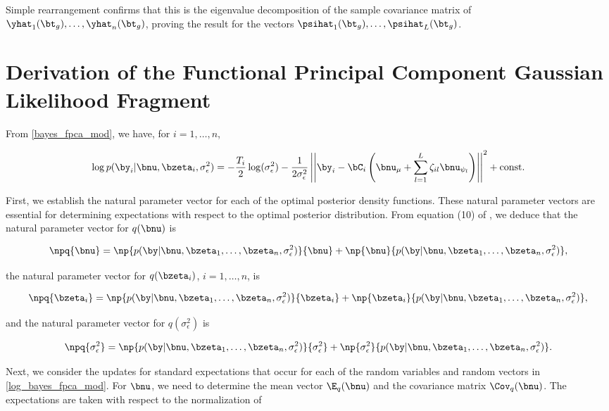 \documentclass[12pt]{article}
\theoremstyle{plain}
\theoremstyle{definition}
\theoremstyle{remark}
\def\sigsqeps{\sigma^2_{\epsilon}}
\def\const{\text{const.}}
\def\numu{\bnu_\mu}
\newcommand\nupsi[1]{\bnu_{\psi_{#1}}}
\begin{document}
\noindent Simple rearrangement confirms that this is the eigenvalue decomposition of
the sample covariance matrix of $\yhat_1 (\bt_g), \dots, \yhat_n (\bt_g)$, proving the result for the vectors
$\psihat_1 (\bt_g), \dots, \psihat_L (\bt_g)$.


\section{Derivation of the Functional Principal Component Gaussian Likelihood Fragment}
\label{app:fpca_gauss_lik_frag}

From \eqref{bayes_fpca_mod}, we have, for $i = 1, \dots, n$, 

\begin{equation}
	\log p (\by_i | \bnu, \bzeta_i, \sigsqeps) =
		-\frac{T_i}{2} \log (\sigsqeps)
		- \frac{1}{2\sigsqeps} \left|\left|
			\by_i - \bC_i \left( \numu + \sum_{l=1}^L \zeta_{il} \nupsi{l} \right)
		\right|\right|^2
		+ \const
\label{log_bayes_fpca_mod}
\end{equation}

First, we establish the natural parameter vector for each of the optimal posterior density functions. These natural
parameter vectors are essential for determining expectations with respect to the optimal posterior distribution.
From equation (10) of \citet{wand17}, we deduce that the natural parameter vector for $q (\bnu)$ is

\[
	\npq{\bnu} =
		\np{p (\by | \bnu, \bzeta_1, \dots, \bzeta_n, \sigsqeps)}{\bnu}
		+ \np{\bnu}{p (\by | \bnu, \bzeta_1, \dots, \bzeta_n, \sigsqeps)},
\]

\noindent the natural parameter vector for $q (\bzeta_i)$, $i = 1, \dots, n$, is

\[
	\npq{\bzeta_i} =
		\np{p (\by | \bnu, \bzeta_1, \dots, \bzeta_n, \sigsqeps)}{\bzeta_i}
		+ \np{\bzeta_i}{p (\by | \bnu, \bzeta_1, \dots, \bzeta_n, \sigsqeps)},
\]

\noindent and the natural parameter vector for $q(\sigsqeps)$ is

\[
	\npq{\sigsqeps} =
		\np{p (\by | \bnu, \bzeta_1, \dots, \bzeta_n, \sigsqeps)}{\sigsqeps}
		+ \np{\sigsqeps}{p (\by | \bnu, \bzeta_1, \dots, \bzeta_n, \sigsqeps)}.
\]

Next, we consider the updates for standard expectations that occur for each of
the random variables and random vectors in
\eqref{log_bayes_fpca_mod}. For $\bnu$, we need to determine the mean vector $\E_q (\bnu)$
and the covariance matrix $\Cov_q (\bnu)$. The expectations are taken with respect to the normalization
of
\end{document}
